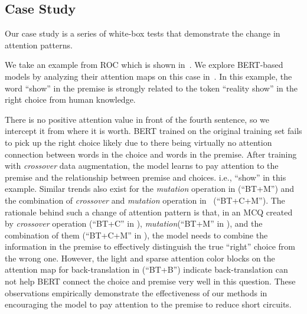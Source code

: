\subsection{Case Study}
\label{sec:case}

Our case study is a series of white-box tests that demonstrate
the change in attention patterns.

We take an example from ROC which is shown in~.
We explore BERT-based models by 
analyzing their attention maps on this case in~.  
In this example, the word ``show'' in the premise is strongly
related to the token ``reality show'' in the right choice from human knowledge. 


There is no positive attention value in front of the fourth sentence, 
so we intercept it from where it is worth. 
BERT trained on the original training set fails 
to pick up the right choice likely due to there being 
virtually no attention connection between words in 
the choice and words in the premise.
After training with \textit{crossover} data augmentation, 
the model learns  
to pay attention to the premise and the relationship 
between premise and choices. 
i.e., ``show'' in this example. 
Similar trends also exist for the \textit{mutation} operation in  (``BT+M'')
and the combination of \textit{crossover} 
and \textit{mutation} operation in~ (``BT+C+M''). 
The rationale behind 
such a change of attention pattern is that, 
in an MCQ created by \textit{crossover} operation (``BT+C'' in ), 
\textit{mutation}(``BT+M'' in ), 
and the combination of them (``BT+C+M'' in ), 
the model needs to combine the information 
in the premise to effectively 
distinguish the true ``right'' choice from the wrong one. 
However, the light and sparse attention color blocks on the attention map for back-translation 
in  (``BT+B'') indicate back-translation 
can not help BERT connect the choice and premise very well in this question.
These observations empirically demonstrate the effectiveness of our methods 
in encouraging the model to pay attention to the premise to reduce 
short circuits. 


